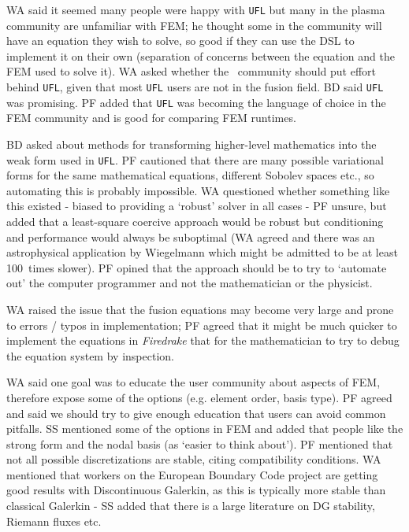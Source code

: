 \documentclass[11pt]{article}
\begin{document}
WA said it seemed many people were happy with {\tt UFL} but many in the plasma 
community are unfamiliar with FEM; he thought some in the community will have 
an equation they wish to solve, so good if they can use the DSL to implement it 
on their own (separation of concerns between the equation and the FEM used to 
solve it).  WA asked whether the \nep\  community should put effort behind 
{\tt UFL}, given that most {\tt UFL} users are not in the fusion field.  BD 
said {\tt UFL} was promising.  PF added that {\tt UFL} was becoming the 
language of choice in the FEM community and is good for comparing FEM runtimes.

BD asked about methods for transforming higher-level mathematics into the weak 
form used in {\tt UFL}.  PF cautioned that there are many possible variational 
forms for the same mathematical equations, different Sobolev spaces etc., so 
automating this is probably impossible.  WA questioned whether something like 
this existed - biased to providing a `robust' solver in all cases - PF unsure, 
but added that a least-square coercive approach would be robust but 
conditioning and performance would always be suboptimal (WA agreed and there 
was an astrophysical application by Wiegelmann which might be admitted
to be at least 100~times slower).  PF opined 
that the approach should be to try to `automate out' the computer programmer 
and not the mathematician or the physicist.

WA raised the issue that the fusion equations may become very large and prone to 
errors / typos in implementation; PF agreed that it might be much quicker to 
implement the equations in {\it Firedrake} that for the mathematician to try to 
debug the equation system by inspection.

WA said one goal was to educate the user community about aspects of FEM, 
therefore expose some of the options (e.g. element order, basis type).  PF 
agreed and said we should try to give enough education that users can avoid 
common pitfalls. SS mentioned some of the options in FEM and added that people 
like the strong form and the nodal basis (as `easier to think about').  PF 
mentioned that not all possible discretizations are stable, citing 
compatibility conditions.  WA mentioned that workers on the European 
Boundary Code project are getting good results with Discontinuous
Galerkin, as this is typically more stable than classical Galerkin - SS 
added that there is a large literature on DG stability, Riemann fluxes etc.
\end{document}
